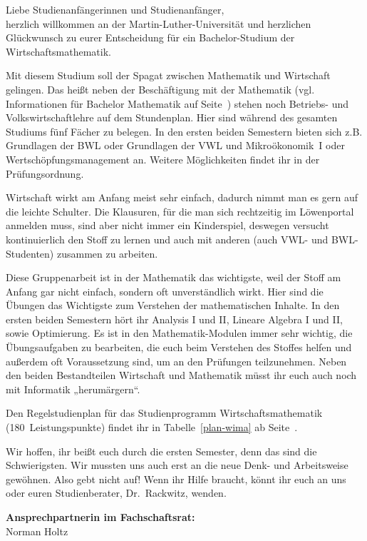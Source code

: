 Liebe Studienanfängerinnen und Studienanfänger,\\
herzlich willkommen an der Martin-Luther-Universität und herzlichen Glückwunsch zu eurer Entscheidung für ein Bachelor-Studium der Wirtschaftsmathematik.

Mit diesem Studium soll der Spagat zwischen Mathematik und Wirtschaft gelingen.
Das heißt neben der Beschäftigung mit der Mathematik (vgl. Informationen für Bachelor Mathematik auf Seite~\pageref{studiengang_mathematik}) stehen noch Betriebs- und Volkswirtschaftlehre auf dem Stundenplan.
Hier sind während des gesamten Studiums fünf Fächer zu belegen.
In den ersten beiden Semestern bieten sich z.B. Grundlagen der BWL oder Grundlagen der VWL und Mikroökonomik~I oder Wertschöpfungsmanagement an.
Weitere Möglichkeiten findet ihr in der Prüfungsordnung.

Wirtschaft wirkt am Anfang meist sehr einfach, dadurch nimmt man es gern auf die leichte Schulter.
Die Klausuren, für die man sich rechtzeitig im Löwenportal anmelden muss, sind aber nicht immer ein Kinderspiel, deswegen versucht kontinuierlich den Stoff zu lernen und auch mit anderen (auch VWL- und BWL-Studenten) zusammen zu arbeiten.

Diese Gruppenarbeit ist in der Mathematik das wichtigste, weil der Stoff am Anfang gar nicht einfach, sondern oft unverständlich wirkt.
Hier sind die Übungen das Wichtigste zum Verstehen der mathematischen Inhalte.
In den ersten beiden Semestern hört ihr Analysis I und II, Lineare Algebra I und II, sowie Optimierung.
Es ist in den Mathematik-Modulen immer sehr wichtig, die Übungsaufgaben zu bearbeiten, die euch beim Verstehen des Stoffes helfen und außerdem oft Voraussetzung sind, um an den Prüfungen teilzunehmen.
Neben den beiden Bestandteilen Wirtschaft und Mathematik müsst ihr euch auch noch mit Informatik „herumärgern“.

Den Regelstudienplan für das Studienprogramm Wirtschaftsmathematik (180~Leistungspunkte) findet ihr in Tabelle~\ref{plan-wima} ab Seite~\pageref{plan-wima}.

Wir hoffen, ihr beißt euch durch die ersten Semester, denn das sind die Schwierigsten.
Wir mussten uns auch erst an die neue Denk- und Arbeitsweise gewöhnen.
Also gebt nicht auf!
Wenn ihr Hilfe braucht, könnt ihr euch an uns oder euren Studienberater, Dr.~Rackwitz, wenden.

\textbf{Ansprechpartnerin im Fachschaftsrat:}\\
Norman Holtz\\
\\



